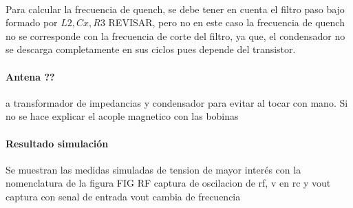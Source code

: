 \paragraph{}
Para calcular la frecuencia de quench, se debe tener en cuenta el filtro paso bajo formado por $L2, Cx, R3$ REVISAR, pero no en este caso la frecuencia de quench no se corresponde con la frecuencia de corte del filtro, ya que, el condensador no se descarga completamente en sus ciclos pues depende del transistor. 

\paragraph{Antena ??} 
a transformador de impedancias  y condensador para evitar al tocar con mano. Si no se hace explicar el acople magnetico con las bobinas

\paragraph{Resultado simulaci\'on} Se muestran las medidas simuladas de tension de mayor inter\'es con la nomenclatura de la figura FIG RF
captura de oscilacion de rf, v en rc y vout
captura con senal de entrada vout cambia de frecuencia

